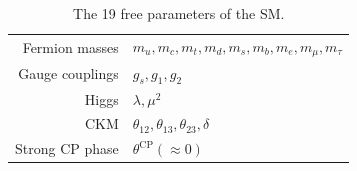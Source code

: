 \begin{table}
  \centering
  \begin{tabular}{r|l}
    \toprule
    Fermion masses & $m_u, m_c, m_t, m_d, m_s, m_b, m_e, m_\mu, m_\tau$ \\
    Gauge couplings & $g_s, g_1, g_2$ \\
    Higgs & $\lambda, \mu^2$ \\
    CKM & $\theta_{12}, \theta_{13}, \theta_{23}, \delta$ \\
    Strong CP phase & $\theta^{\text{CP}} (\approx 0)$ \\
    \bottomrule
  \end{tabular}
  \caption[Free Parameters in the SM]{The 19 free parameters of the SM.}\label{tab:SM_free_parameters}
\end{table}